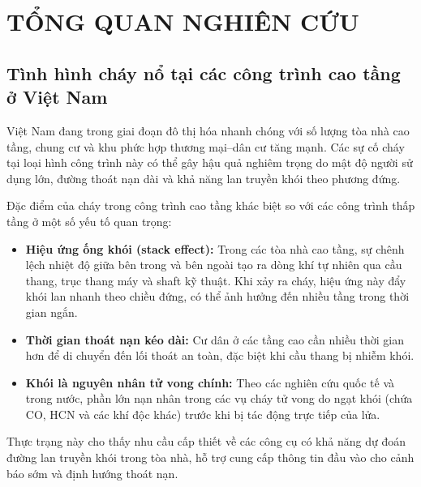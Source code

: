 
\chapter{TỔNG QUAN NGHIÊN CỨU}
\label{chap:tongquan}

\section{Tình hình cháy nổ tại các công trình cao tầng ở Việt Nam}
\label{sec:tinhhinhchay}

Việt Nam đang trong giai đoạn đô thị hóa nhanh chóng với số lượng tòa nhà cao tầng, chung cư và khu phức hợp thương mại--dân cư tăng mạnh. Các sự cố cháy tại loại hình công trình này có thể gây hậu quả nghiêm trọng do mật độ người sử dụng lớn, đường thoát nạn dài và khả năng lan truyền khói theo phương đứng.

Đặc điểm của cháy trong công trình cao tầng khác biệt so với các công trình thấp tầng ở một số yếu tố quan trọng:

\begin{itemize}
  \item \textbf{Hiệu ứng ống khói (stack effect):} Trong các tòa nhà cao tầng, sự chênh lệch nhiệt độ giữa bên trong và bên ngoài tạo ra dòng khí tự nhiên qua cầu thang, trục thang máy và shaft kỹ thuật. Khi xảy ra cháy, hiệu ứng này đẩy khói lan nhanh theo chiều đứng, có thể ảnh hưởng đến nhiều tầng trong thời gian ngắn.
  \item \textbf{Thời gian thoát nạn kéo dài:} Cư dân ở các tầng cao cần nhiều thời gian hơn để di chuyển đến lối thoát an toàn, đặc biệt khi cầu thang bị nhiễm khói.
  \item \textbf{Khói là nguyên nhân tử vong chính:} Theo các nghiên cứu quốc tế và trong nước, phần lớn nạn nhân trong các vụ cháy tử vong do ngạt khói (chứa CO, HCN và các khí độc khác) trước khi bị tác động trực tiếp của lửa.
\end{itemize}

Thực trạng này cho thấy nhu cầu cấp thiết về các công cụ có khả năng dự đoán đường lan truyền khói trong tòa nhà, hỗ trợ cung cấp thông tin đầu vào cho cảnh báo sớm và định hướng thoát nạn.

